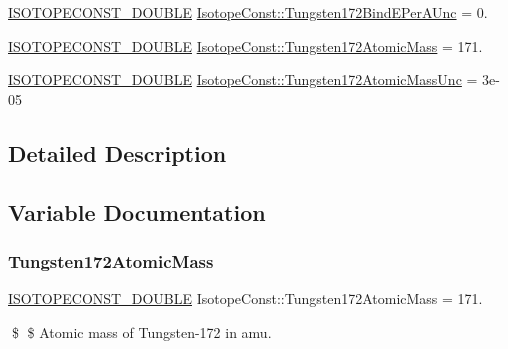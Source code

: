 \begin{DoxyCompactItemize}
\mbox{\hyperlink{group___isotope_const-_macros_ga8f45a7272ce02c0b4c65c44636ed719a}{I\+S\+O\+T\+O\+P\+E\+C\+O\+N\+S\+T\+\_\+\+D\+O\+U\+B\+LE}} \mbox{\hyperlink{group___isotope_const-_tungsten-_w172_gabf0946a94c62c91d816e90a45521ed46}{Isotope\+Const\+::\+Tungsten172\+Bind\+E\+Per\+A\+Unc}} = 0.
\item 
\mbox{\hyperlink{group___isotope_const-_macros_ga8f45a7272ce02c0b4c65c44636ed719a}{I\+S\+O\+T\+O\+P\+E\+C\+O\+N\+S\+T\+\_\+\+D\+O\+U\+B\+LE}} \mbox{\hyperlink{group___isotope_const-_tungsten-_w172_ga12a4e13b1747f443f9fca6bd47295a0b}{Isotope\+Const\+::\+Tungsten172\+Atomic\+Mass}} = 171.
\item 
\mbox{\hyperlink{group___isotope_const-_macros_ga8f45a7272ce02c0b4c65c44636ed719a}{I\+S\+O\+T\+O\+P\+E\+C\+O\+N\+S\+T\+\_\+\+D\+O\+U\+B\+LE}} \mbox{\hyperlink{group___isotope_const-_tungsten-_w172_ga65e54e6447d8e5f03bd278da9ae7e498}{Isotope\+Const\+::\+Tungsten172\+Atomic\+Mass\+Unc}} = 3e-\/05
\end{DoxyCompactItemize}


\subsection{Detailed Description}


\subsection{Variable Documentation}
\mbox{\label{group___isotope_const-_tungsten-_w172_ga12a4e13b1747f443f9fca6bd47295a0b}} 
\subsubsection{\texorpdfstring{Tungsten172\+Atomic\+Mass}{Tungsten172AtomicMass}}
{\footnotesize\ttfamily \mbox{\hyperlink{group___isotope_const-_macros_ga8f45a7272ce02c0b4c65c44636ed719a}{I\+S\+O\+T\+O\+P\+E\+C\+O\+N\+S\+T\+\_\+\+D\+O\+U\+B\+LE}} Isotope\+Const\+::\+Tungsten172\+Atomic\+Mass = 171.}

\$ \$ Atomic mass of Tungsten-\/172 in amu. \mbox{\label{group___isotope_const-_tungsten-_w172_ga65e54e6447d8e5f03bd278da9ae7e498}} 
